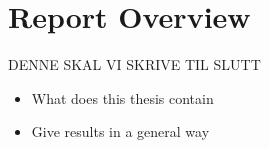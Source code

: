 \section{Report Overview}

DENNE SKAL VI SKRIVE TIL SLUTT

\begin{itemize}
\item What does this thesis contain
\item Give results in a general way
\end{itemize}